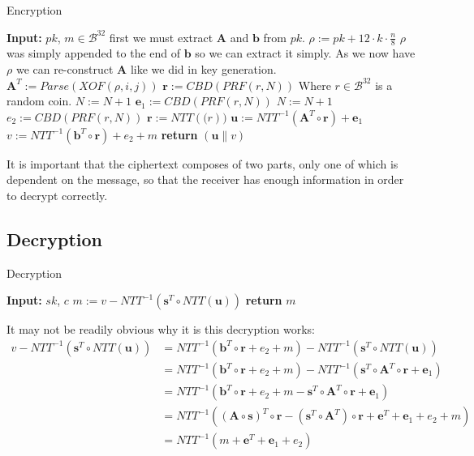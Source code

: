 \documentclass[a4paper, 10pt]{article}
\theoremstyle{definition}
\begin{document}
\begin{algorithm}[H]
    \caption{Encryption}
    \begin{algorithmic}[1]
    \State \textbf{Input:} $pk$, $m \in \mathcal{B}^{32}$
    \State first we must extract $\mathbf{A}$ and $\mathbf{b}$ from $pk$.
    \State $\rho:=pk+12\cdot k\cdot \frac{n}{8}$ \Comment $\rho$ was simply appended to the end of $\mathbf{b}$ so we can extract it simply. As we now have $\rho$ we can re-construct $\mathbf{A}$ like we did in key generation.
            \State $\mathbf{A}^T:=Parse(XOF(\rho , i, j))$ 
        \EndFor
    \EndFor
        \State $\mathbf{r}:=CBD(PRF(r ,N))$ \Comment Where $r \in \mathcal{B}^{32}$ is a random coin.
        \State $N:=N+1$
    \EndFor
        \State $\mathbf{e}_1:=CBD(PRF(r ,N))$
        \State $N:=N+1$
    \EndFor
    \State $e_2:=CBD(PRF(r, N))$
    \State $\mathbf{r}:=NTT(\mathbf(r))$
    \State $\mathbf{u}:=NTT^{-1}(\mathbf{A}^T\circ \mathbf{r})+\mathbf{e}_1$
    \State $v:=NTT^{-1}(\mathbf{b}^T\circ \mathbf{r})+e_2 + m $
    \State \textbf{return} $(\mathbf{u}\|v)$
    \end{algorithmic}
\end{algorithm}

It is important that the ciphertext composes of two parts, only one of which is dependent on the message, so that the receiver has enough information in order to decrypt correctly.

\subsection{Decryption}

\begin{algorithm}[H]
    \caption{Decryption}
    \begin{algorithmic}[1]
    \State \textbf{Input:} $sk$, $c$
    \State $m:=v-NTT^{-1}(\mathbf{s}^T\circ NTT(\mathbf{u}))$
    \State \textbf{return} $m$
    \end{algorithmic}
\end{algorithm}

It may not be readily obvious why it is this decryption works:
\begin{align*}
    v-NTT^{-1}(\mathbf{s}^T\circ NTT(\mathbf{u})) &= NTT^{-1}(\mathbf{b}^T\circ \mathbf{r}+e_2+m)-NTT^{-1}(\mathbf{s}^T\circ NTT(\mathbf{u}))\\
    &=NTT^{-1}(\mathbf{b}^T\circ \mathbf{r}+e_2+m)-NTT^{-1}(\mathbf{s}^T\circ \mathbf{A}^T\circ \mathbf{r}+\mathbf{e}_1)\\
    &=NTT^{-1}(\mathbf{b}^T\circ \mathbf{r}+e_2+m-\mathbf{s}^T\circ \mathbf{A}^T\circ \mathbf{r}+\mathbf{e}_1)\\
    &=NTT^{-1}(( \mathbf{A} \circ \mathbf{s})^T \circ \mathbf{r} - (\mathbf{s}^T \circ \mathbf{A} ^T) \circ \mathbf{r} + \mathbf{e} ^T + \mathbf{e}_1 + e_2 + m)\\
    &=NTT^{-1}(m+\mathbf{e}^T+\mathbf{e}_1+e_2)
\end{align*}
\end{document}
